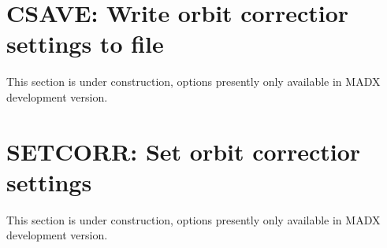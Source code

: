 


\section{CSAVE: Write orbit correctior settings to file}
 This section is under construction, options presently only available in
 MADX development version.  

\section{SETCORR: Set orbit correctior settings}
 This section is under construction, options presently only available in
 MADX development version.  

